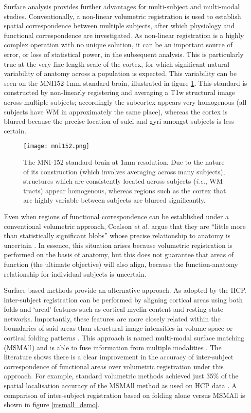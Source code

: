 Surface analysis provides further advantages for multi-subject and multi-modal studies. Conventionally, a non-linear volumetric registration is used to establish spatial correspondence between multiple subjects, after which physiology and functional correspondence are investigated. As non-linear registration is a highly complex operation with no unique solution, it can be an important source of error, or loss of statistical power, in the subsequent analysis. This is particularly true at the very fine length scale of the cortex, for which significant natural variability of anatomy across a population is expected. This variability can be seen on the MNI152 1mm standard brain, illustrated in figure \ref{mni152}. This standard is constructed by non-linearly registering and averaging a T1w structural image across multiple subjects; accordingly the subcortex appears very homogenous (all subjects have WM in approximately the same place), whereas the cortex is blurred because the precise location of sulci and gyri amongst subjects is less certain. 

\begin{figure}[h]
\centering
\texttt{[image: mni152.png]}
\caption{The MNI-152 standard brain at 1mm resolution. Due to the nature of its construction (which involves averaging across many subjects), structures which are consistently located across subjects (\textit{i.e.}, WM tracts) appear homogenous, whereas regions such as the cortex that are highly variable between subjects are blurred significantly.}
\label{mni152}
\end{figure}

Even when regions of functional correspondence can be established under a conventional volumetric approach, Coalson \textit{et al.} argue that they are ``little more than statistically significant blobs” whose precise relationship to anatomy is uncertain \cite{Coalson2017}. In essence, this situation arises because volumetric registration is performed on the basis of anatomy, but this does not guarantee that areas of function (the ultimate objective) will also align, because the function-anatomy relationship for individual subjects is uncertain. 

Surface-based methods provide an alternative approach. As adopted by the HCP, inter-subject registration can be performed by aligning cortical areas using both folds and `areal' features such as cortical myelin content and resting state networks. Importantly, these features are more closely related within the boundaries of said areas than structural image intensities in volume space \cite{Glasser2016a} or cortical folding patterns \cite{Robinson2014, Robinson2018}. This approach is named multi-modal surface matching (MSMAll) and is able to fuse information from multiple modalities \cite{Robinson2013}. The literature shows there is a clear improvement in the accuracy of inter-subject correspondence of functional areas over volumetric registration under this approach. For example, standard volumetric methods achieved just 35\% of the spatial localisation accuracy of the MSMAll method as used on HCP data \cite{Coalson2017}. A comparison of inter-subject registration based on folding alone versus MSMAll is shown in figure \ref{msmall_demo}.

